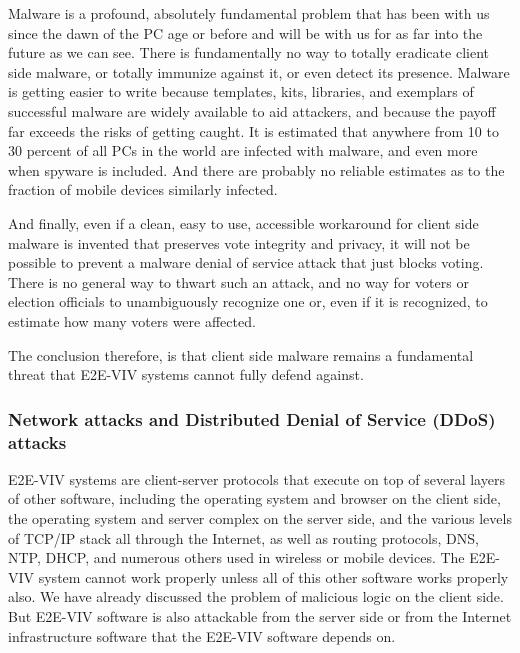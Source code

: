 Malware is a profound, absolutely fundamental problem that has been
with us since the dawn of the PC age or before and will be with us for
as far into the future as we can see. There is fundamentally no way to
totally eradicate client side malware, or totally immunize against it,
or even detect its presence. Malware is getting easier to write
because templates, kits, libraries, and exemplars of successful
malware are widely available to aid attackers, and because the payoff
far exceeds the risks of getting caught. It is estimated that anywhere
from 10 to 30 percent of all PCs in the world are infected with
malware, and even more when spyware is included. And there are
probably no reliable estimates as to the fraction of mobile devices
similarly infected.

And finally, even if a clean, easy to use, accessible workaround for
client side malware is invented that preserves vote integrity and
privacy, it will not be possible to prevent a malware denial of
service attack that just blocks voting. There is no general way to
thwart such an attack, and no way for voters or election officials to
unambiguously recognize one or, even if it is recognized, to estimate
how many voters were affected.

The conclusion therefore, is that client side malware remains a
fundamental threat that E2E-VIV systems cannot fully defend against. 

\subsubsection{Network attacks and Distributed Denial of Service
  (DDoS) attacks}

E2E-VIV systems are client-server protocols that execute on top of
several layers of other software, including the operating system and
browser on the client side, the operating system and server complex on
the server side, and the various levels of TCP/IP stack all through
the Internet, as well as routing protocols, DNS, NTP, DHCP, and
numerous others used in wireless or mobile devices. The E2E-VIV system
cannot work properly unless all of this other software works properly
also. We have already discussed the problem of malicious logic on the
client side. But E2E-VIV software is also attackable from the server
side or from the Internet infrastructure software that the E2E-VIV
software depends on.


